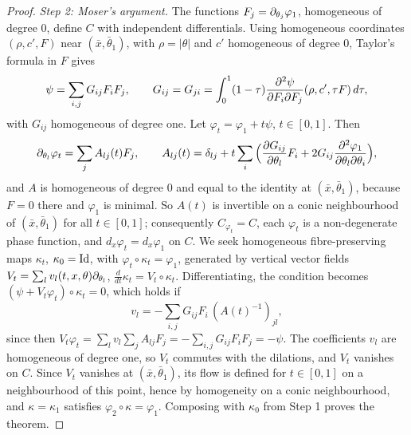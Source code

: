 \begin{proof}
  \emph{Step 2: Moser's argument.}  The functions $F_j=\partial_{\theta_j}\varphi_1$,
  homogeneous of degree $0$, define $C$ with independent differentials.  Using
  homogeneous coordinates $(\rho,c',F)$ near $(\bar x,\bar\theta_1)$, with
  $\rho=|\theta|$ and $c'$ homogeneous of degree $0$, Taylor's formula in $F$
  gives
  \begin{equation*}
    \psi=\sum_{i,j}G_{ij}F_iF_j,\qquad G_{ij}=G_{ji}=\int_0^1(1-\tau)
    \frac{\partial^2\psi}{\partial F_i\partial F_j}(\rho,c',\tau F)\,d\tau,
  \end{equation*}
  with $G_{ij}$ homogeneous of degree one.  Let $\varphi_t=\varphi_1+t\psi$,
  $t\in[0,1]$.  Then
  \begin{equation*}
    \partial_{\theta_l}\varphi_t=\sum_jA_{lj}(t)F_j,\qquad A_{lj}(t)=\delta_{lj}+
    t\sum_i\Big(\frac{\partial G_{ij}}{\partial\theta_l}F_i+2G_{ij}
    \frac{\partial^2\varphi_1}{\partial\theta_l\partial\theta_i}\Big),
  \end{equation*}
  and $A$ is homogeneous of degree $0$ and equal to the identity at
  $(\bar x,\bar\theta_1)$, because $F=0$ there and $\varphi_1$ is minimal.  So
  $A(t)$ is invertible on a conic neighbourhood of $(\bar x,\bar\theta_1)$ for
  all $t\in[0,1]$; consequently $C_{\varphi_t}=C$, each $\varphi_t$ is a
  non-degenerate phase function, and $d_x\varphi_t=d_x\varphi_1$ on $C$.  We seek
  homogeneous fibre-preserving maps $\kappa_t$, $\kappa_0=\operatorname{Id}$, with
  $\varphi_t\circ\kappa_t=\varphi_1$, generated by vertical vector fields
  $V_t=\sum_lv_l(t,x,\theta)\partial_{\theta_l}$, $\frac d{dt}\kappa_t=V_t\circ\kappa_t$.
  Differentiating, the condition becomes $(\psi+V_t\varphi_t)\circ\kappa_t=0$,
  which holds if
  \begin{equation*}
    v_l=-\sum_{i,j}G_{ij}F_i\,(A(t)^{-1})_{jl},
  \end{equation*}
  since then $V_t\varphi_t=\sum_lv_l\sum_jA_{lj}F_j=-\sum_{i,j}G_{ij}F_iF_j=-\psi$.
  The coefficients $v_l$ are homogeneous of degree one, so $V_t$ commutes with
  the dilations, and $V_t$ vanishes on $C$.  Since $V_t$ vanishes at
  $(\bar x,\bar\theta_1)$, its flow is defined for $t\in[0,1]$ on a neighbourhood
  of this point, hence by homogeneity on a conic neighbourhood, and
  $\kappa=\kappa_1$ satisfies $\varphi_2\circ\kappa=\varphi_1$.  Composing with
  $\kappa_0$ from Step 1 proves the theorem.
\end{proof}

